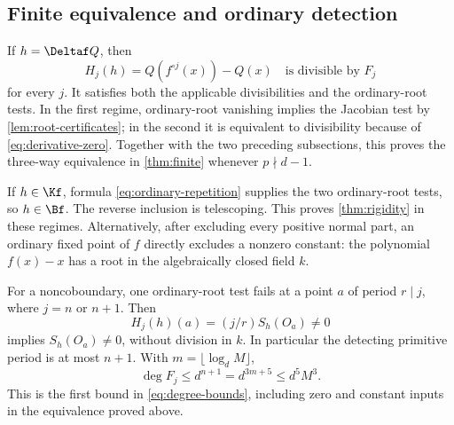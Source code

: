\subsection{Finite equivalence and ordinary detection}

If $h=\Deltaf Q$, then
\begin{equation}
 H_j(h)=Q(f^{\circ j}(x))-Q(x)
\quad\text{is divisible by }F_j
 \label{eq:polynomial-telescoping}
\end{equation}
for every $j$. It satisfies both the applicable divisibilities
and the ordinary-root tests. In the first regime, ordinary-root
vanishing implies the Jacobian test by
\cref{lem:root-certificates}; in the second it is equivalent
to divisibility because of \eqref{eq:derivative-zero}.
Together with the two preceding subsections, this proves the
three-way equivalence in \cref{thm:finite} whenever $p\nmid d-1$.

If $h\in\Kf$, formula \eqref{eq:ordinary-repetition} supplies
the two ordinary-root tests, so $h\in\Bf$. The reverse inclusion
is telescoping. This proves \cref{thm:rigidity} in these regimes.
Alternatively, after excluding every positive normal part, an
ordinary fixed point of $f$ directly excludes a nonzero constant:
the polynomial $f(x)-x$ has a root in the algebraically closed
field $k$.

For a noncoboundary, one ordinary-root test fails at a point $a$
of period $r\mid j$, where $j=n$ or $n+1$. Then
\[
 H_j(h)(a)=(j/r)S_h(O_a)\ne0
\]
implies $S_h(O_a)\ne0$, without division in $k$. In particular
the detecting primitive period is at most $n+1$. With
$m=\lfloor\log_dM\rfloor$,
\[
 \deg F_j\le d^{n+1}=d^{3m+5}\le d^5M^3.
\]
This is the first bound in \eqref{eq:degree-bounds}, including
zero and constant inputs in the equivalence proved above.

